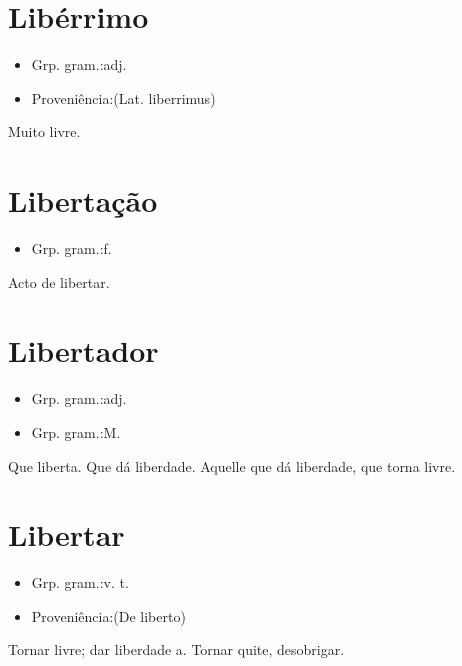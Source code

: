 \section{Libérrimo}
\begin{itemize}
\item {Grp. gram.:adj.}
\end{itemize}
\begin{itemize}
\item {Proveniência:(Lat. \textunderscore liberrimus\textunderscore )}
\end{itemize}
Muito livre.
\section{Libertação}
\begin{itemize}
\item {Grp. gram.:f.}
\end{itemize}
Acto de libertar.
\section{Libertador}
\begin{itemize}
\item {Grp. gram.:adj.}
\end{itemize}
\begin{itemize}
\item {Grp. gram.:M.}
\end{itemize}
Que liberta.
Que dá liberdade.
Aquelle que dá liberdade, que torna livre.
\section{Libertar}
\begin{itemize}
\item {Grp. gram.:v. t.}
\end{itemize}
\begin{itemize}
\item {Proveniência:(De \textunderscore liberto\textunderscore )}
\end{itemize}
Tornar livre; dar liberdade a.
Tornar quite, desobrigar.
\section{Libertário}
\begin{itemize}
\item {Grp. gram.:m.}
\end{itemize}
\begin{itemize}
\item {Utilização:Neol.}
\end{itemize}
\begin{itemize}
\item {Proveniência:(De \textunderscore libertar\textunderscore )}
\end{itemize}
O mesmo que \textunderscore anarchista\textunderscore .
